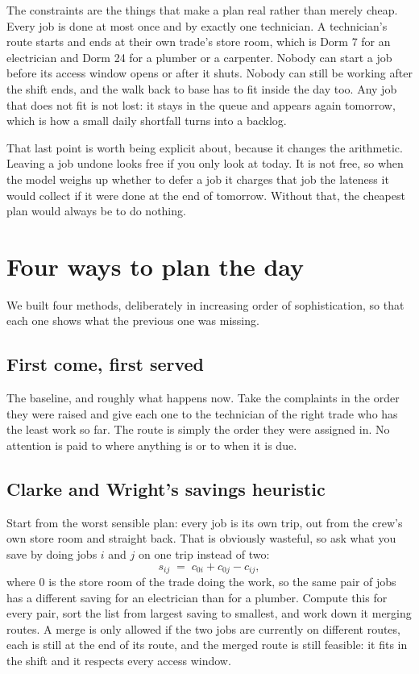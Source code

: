 \documentclass[11pt]{article}
\begin{document}
The constraints are the things that make a plan real rather than merely
cheap. Every job is done at most once and by exactly one technician. A
technician's route starts and ends at their own trade's store room, which is
Dorm 7 for an electrician and Dorm 24 for a plumber or a carpenter. Nobody
can start a job before its access window opens or after it shuts. Nobody can
still be working after the shift ends, and the walk back to base has to fit
inside the day too. Any job that does not fit is not lost: it stays in the queue and
appears again tomorrow, which is how a small daily shortfall turns into a
backlog.

That last point is worth being explicit about, because it changes the
arithmetic. Leaving a job undone looks free if you only look at today. It is
not free, so when the model weighs up whether to defer a job it charges that
job the lateness it would collect if it were done at the end of tomorrow.
Without that, the cheapest plan would always be to do nothing.

\section{Four ways to plan the day}

We built four methods, deliberately in increasing order of sophistication, so
that each one shows what the previous one was missing.

\subsection{First come, first served}

The baseline, and roughly what happens now. Take the complaints in the order
they were raised and give each one to the technician of the right trade who
has the least work so far. The route is simply the order they were assigned
in. No attention is paid to where anything is or to when it is due.

\subsection{Clarke and Wright's savings heuristic}

Start from the worst sensible plan: every job is its own trip, out from the
crew's own store room and straight back. That is obviously wasteful, so ask
what you save by doing jobs $i$ and $j$ on one trip instead of two:
\[
s_{ij} \;=\; c_{0i} + c_{0j} - c_{ij},
\]
where $0$ is the store room of the trade doing the work, so the same pair of
jobs has a different saving for an electrician than for a plumber.
Compute this for every pair, sort the list from largest saving to smallest,
and work down it merging routes. A merge is only allowed if the two jobs are
currently on different routes, each is still at the end of its route, and the
merged route is still feasible: it fits in the shift and it respects every
access window.
\end{document}
